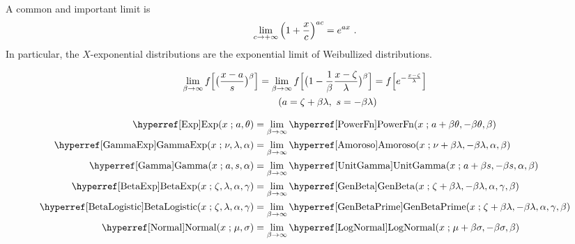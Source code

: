 

\clearpage
{}
\label{sec:Limits}

\label{sec:Limits:exp}
A common and important limit is 
\[
\lim_{c\rightarrow+\infty} \left(1 + \frac{x}{c} \right)^{a c} = e^{a x} \ . 
\notag
\]
In particular, the $X$-exponential distributions are the exponential limit of Weibullized distributions.

\begin{align*}
\lim_{\beta\rightarrow\infty} f\Bigl[ \bigl(\frac{x-a}{s}\bigr)^{\beta} \Bigr]
&= \lim_{\beta\rightarrow \infty} f\Bigl[\bigl(1 - \frac{1}{\beta} \frac{x-\pLoc }{ \pScale}\bigr)^{\beta}  \Bigr] =  f\Bigl[ e^{-\frac{x-\pLoc}{\pScale}} \Bigr] \checked
\\ & \qquad (a = \pLoc + \beta\pScale, \ s = - \beta \pScale) 
\checked
\end{align*}



\begin{align*}
\opr{Exp}(x\given a,\theta) &=  \lim_{\beta\rightarrow\infty} \opr{PowerFn} (x\given a+\beta\theta,-\beta\theta,\beta) 
\\
 \opr{GammaExp}(x\given \nu, \lambda, \alpha) &=  \lim_{\beta\rightarrow\infty} \opr{Amoroso}(x\given \nu+\beta \lambda,-\beta \lambda, \alpha,\beta)
\\
\opr{Gamma}(x\given a,s,\alpha) &= \lim_{\beta\rightarrow\infty} \opr{UnitGamma}(x\given a+\beta s,-\beta s, \alpha,\beta) 
\\
\opr{BetaExp}(x\given \pLoc, \pScale, \alpha, \gamma) 
& = \lim_{\beta\rightarrow\infty } \opr{GenBeta}(x\given \pLoc+\beta\lambda, -\beta\pScale, \alpha, \gamma, \beta) 
\\
  \opr{BetaLogistic}(x\given \pLoc, \pScale, \alpha, \gamma)  &=
 \lim_{\beta\rightarrow\infty}  \opr{GenBetaPrime}(x\given \pLoc+\beta\pScale, -\beta \pScale, \alpha, \gamma, \beta)  
\\
\opr{Normal}(x\given \mu, \sigma) & =   \lim_{\beta\rightarrow\infty} \opr{LogNormal}(x\given \mu + \beta\sigma, -\beta\sigma, \beta) \checked
\end{align*}




